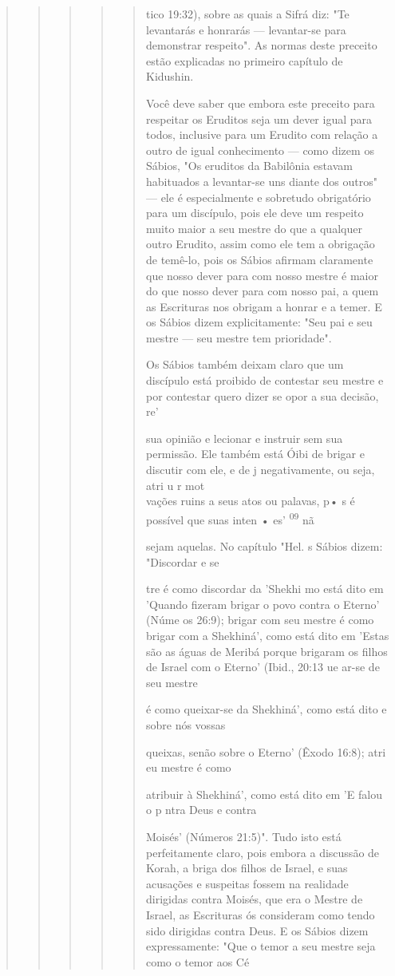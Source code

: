 \begin{quote}
\begin{quote}
\begin{quote}
\begin{quote}
\begin{quote}


tico 19:32), sobre as quais a Sifrá diz: "Te levantarás e honrarás ---
levantar-se para demonstrar respeito". As normas deste preceito estão
explicadas no pri­meiro capítulo de Kidushin.

Você deve saber que embora este preceito para respeitar os Erudi­tos
seja um dever igual para todos, inclusive para um Erudito com relação a
outro de igual conhecimento --- como dizem os Sábios, "Os eruditos da
Babi­lônia estavam habituados a levantar-se uns diante dos outros" ---
ele é especial­mente e sobretudo obrigatório para um discípulo, pois ele
deve um respeito muito maior a seu mestre do que a qualquer outro
Erudito, assim como ele tem a obrigação de temê-lo, pois os Sábios
afirmam claramente que nosso dever pa­ra com nosso mestre é maior do que
nosso dever para com nosso pai, a quem as Escrituras nos obrigam a
honrar e a temer. E os Sábios dizem explicitamente: "Seu pai e seu
mestre --- seu mestre tem prioridade".

Os Sábios também deixam claro que um discípulo está proibido de
contestar seu mestre e por contestar quero dizer se opor a sua decisão,
re'

sua opinião e lecionar e instruir sem sua permissão. Ele também está
Óibi de brigar e discutir com ele, e de j negativamente, ou seja, atri u
r mot\\
vações ruins a seus atos ou palavas, p• s é possível que suas inten •
es' \textsuperscript{09} nã

sejam aquelas. No capítulo "Hel. s Sábios dizem: "Discordar e se

tre é como discordar da 'Shekhi mo está dito em 'Quando fizeram brigar o
povo contra o Eterno' (Núme os 26:9); brigar com seu mestre é como
brigar com a Shekhiná', como está dito em 'Estas são as águas de Meribá
porque bri­garam os filhos de Israel com o Eterno' (Ibid., 20:13 ue
ar-se de seu mestre

é como queixar-se da Shekhiná', como está dito e sobre nós vossas

queixas, senão sobre o Eterno' (Êxodo 16:8); atri eu mestre é como

atribuir à Shekhiná', como está dito em 'E falou o p ntra Deus e contra

Moisés' (Números 21:5)". Tudo isto está perfeitamente claro, pois embora
a dis­cussão de Korah, a briga dos filhos de Israel, e suas acusações e
suspeitas fos­sem na realidade dirigidas contra Moisés, que era o Mestre
de Israel, as Escritu­ras ós consideram como tendo sido dirigidas contra
Deus. E os Sábios dizem expressamente: "Que o temor a seu mestre seja
como o temor aos Cé


\end{quote}
\end{quote}
\end{quote}
\end{quote}
\end{quote}
